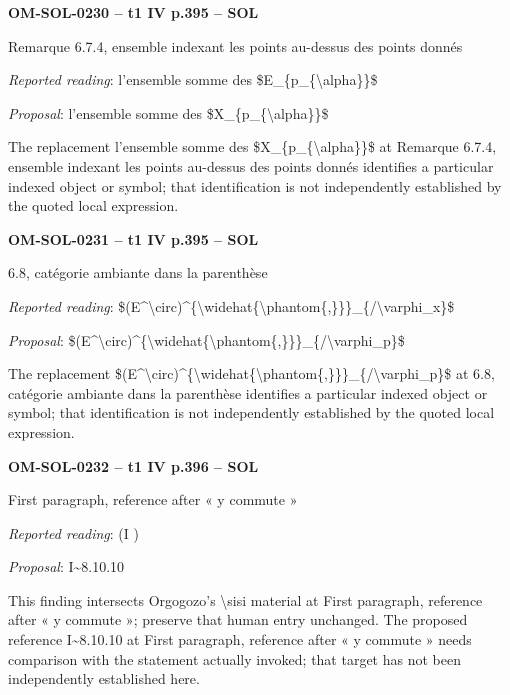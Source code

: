 \par\noindent\textbf{OM-SOL-0230 -- t1 IV p.395 -- SOL}\par
Remarque 6.7.4, ensemble indexant les points au-dessus des points donnés\par
\emph{Reported reading}: l'ensemble somme des \$E\_\{p\_\{\textbackslash{}alpha\}\}\$\par
\emph{Proposal}: l'ensemble somme des \$X\_\{p\_\{\textbackslash{}alpha\}\}\$\par
The replacement l'ensemble somme des \$X\_\{p\_\{\textbackslash{}alpha\}\}\$ at Remarque 6.7.4, ensemble indexant les points au-dessus des points donnés identifies a particular indexed object or symbol; that identification is not independently established by the quoted local expression.\par
\par\noindent\textbf{OM-SOL-0231 -- t1 IV p.395 -- SOL}\par
6.8, catégorie ambiante dans la parenthèse\par
\emph{Reported reading}: \$(E\textasciicircum{}\textbackslash{}circ)\textasciicircum{}\{\textbackslash{}widehat\{\textbackslash{}phantom\{,\}\}\}\_\{/\textbackslash{}varphi\_x\}\$\par
\emph{Proposal}: \$(E\textasciicircum{}\textbackslash{}circ)\textasciicircum{}\{\textbackslash{}widehat\{\textbackslash{}phantom\{,\}\}\}\_\{/\textbackslash{}varphi\_p\}\$\par
The replacement \$(E\textasciicircum{}\textbackslash{}circ)\textasciicircum{}\{\textbackslash{}widehat\{\textbackslash{}phantom\{,\}\}\}\_\{/\textbackslash{}varphi\_p\}\$ at 6.8, catégorie ambiante dans la parenthèse identifies a particular indexed object or symbol; that identification is not independently established by the quoted local expression.\par
\par\noindent\textbf{OM-SOL-0232 -- t1 IV p.396 -- SOL}\par
First paragraph, reference after « y commute »\par
\emph{Reported reading}: (I )\par
\emph{Proposal}: I\textasciitilde{}8.10.10\par
This finding intersects Orgogozo's \textbackslash{}sisi material at First paragraph, reference after « y commute »; preserve that human entry unchanged. The proposed reference I\textasciitilde{}8.10.10 at First paragraph, reference after « y commute » needs comparison with the statement actually invoked; that target has not been independently established here.\par
